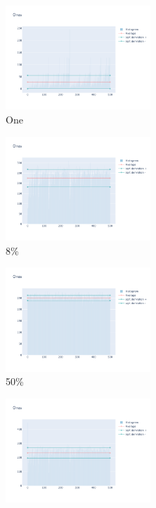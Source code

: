 \documentclass[12pt, fleqn]{report}                             %
\theoremstyle{break}                                            %
\begin{document}
      \begin{figure}[ht!]
        \centering
        \begin{subfigure}[b]{0.4\linewidth}
          \includegraphics[width=0.6\textwidth]{Images/90/dia-a.png}
          \caption{One}
        \end{subfigure}
        \begin{subfigure}[b]{0.4\linewidth}
          \includegraphics[width=0.6\textwidth]{Images/90/dia-b.png}
          \caption{8\%}
        \end{subfigure}
        \begin{subfigure}[b]{0.4\linewidth}
          \includegraphics[width=0.6\textwidth]{Images/90/dia-c.png}
          \caption{50\%}
        \end{subfigure}
        \begin{subfigure}[b]{0.4\linewidth}
          \includegraphics[width=0.6\textwidth]{Images/90/dia-d.png}

\end{subfigure}
\end{figure}
\end{document}
